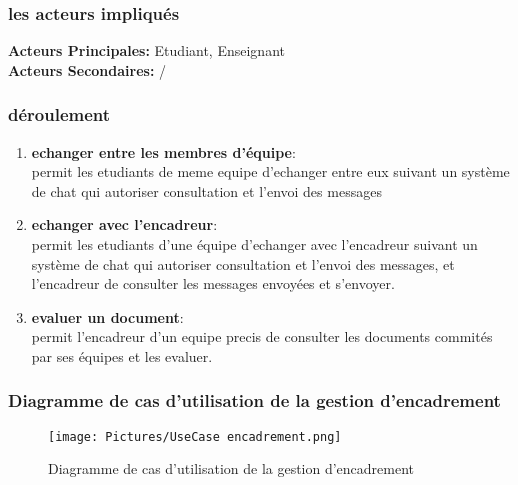 \documentclass[11pt,fleqn]{book} %
\begin{document}
\subsubsection{les acteurs impliqués}
\textbf{Acteurs Principales:} Etudiant, Enseignant\\
\textbf{Acteurs Secondaires:} /
\subsubsection{déroulement}
\begin{enumerate}
    \item \textbf{echanger entre les membres d'équipe}: \\
    permit les etudiants de meme equipe d'echanger entre eux suivant  un système de chat qui autoriser consultation et l'envoi des messages
     \item \textbf{echanger avec l'encadreur}: \\
    permit les etudiants d'une équipe d'echanger avec l'encadreur suivant  un système de chat qui autoriser consultation et l'envoi des messages, et l'encadreur de consulter les messages envoyées et s'envoyer.
    \item \textbf{evaluer un document}: \\
    permit l'encadreur d'un equipe precis de consulter les documents commités par ses équipes et les evaluer.
    
\end{enumerate}
\newpage
\subsubsection{Diagramme de cas d’utilisation de la gestion d'encadrement}
\begin{figure}[h]
    \centering
    \texttt{[image: Pictures/UseCase encadrement.png]}
    \caption{Diagramme de cas d’utilisation de la gestion d'encadrement}
    \label{fig:pca}
\end{figure}

\newpage
\end{document}
